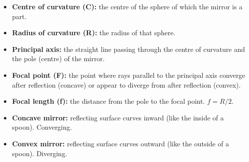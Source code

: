 \begin{defbox}
\begin{itemize}[noitemsep]
  \item \textbf{Centre of curvature (C):} the centre
  of the sphere of which the mirror is a part.
  \item \textbf{Radius of curvature (R):} the radius
  of that sphere.
  \item \textbf{Principal axis:} the straight line
  passing through the centre of curvature and the
  pole (centre) of the mirror.
  \item \textbf{Focal point (F):} the point where
  rays parallel to the principal axis converge after
  reflection (concave) or appear to diverge from
  after reflection (convex).
  \item \textbf{Focal length (f):} the distance from
  the pole to the focal point. $f = R/2$.
  \item \textbf{Concave mirror:} reflecting surface
  curves inward (like the inside of a spoon). Converging.
  \item \textbf{Convex mirror:} reflecting surface
  curves outward (like the outside of a spoon).
  Diverging.
\end{itemize}
\end{defbox}

